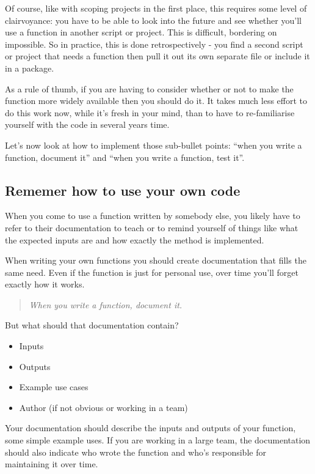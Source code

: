 \documentclass[
  letterpaper,
  DIV=11,
  numbers=noendperiod]{scrreprt}
\providecommand{\tightlist}{%
  \setlength{\itemsep}{0pt}\setlength{\parskip}{0pt}}\usepackage{longtable,booktabs,array}
\begin{document}
Of course, like with scoping projects in the first place, this requires
some level of clairvoyance: you have to be able to look into the future
and see whether you'll use a function in another script or project. This
is difficult, bordering on impossible. So in practice, this is done
retrospectively - you find a second script or project that needs a
function then pull it out its own separate file or include it in a
package.

As a rule of thumb, if you are having to consider whether or not to make
the function more widely available then you should do it. It takes much
less effort to do this work now, while it's fresh in your mind, than to
have to re-familiarise yourself with the code in several years time.

Let's now look at how to implement those sub-bullet points: ``when you
write a function, document it'' and ``when you write a function, test
it''.

\subsection{Rememer how to use your own
code}\label{rememer-how-to-use-your-own-code}

When you come to use a function written by somebody else, you likely
have to refer to their documentation to teach or to remind yourself of
things like what the expected inputs are and how exactly the method is
implemented.

When writing your own functions you should create documentation that
fills the same need. Even if the function is just for personal use, over
time you'll forget exactly how it works.

\begin{quote}
\emph{When you write a function, document it.}
\end{quote}

But what should that documentation contain?

\begin{itemize}
\tightlist
\item
  Inputs
\item
  Outputs
\item
  Example use cases
\item
  Author (if not obvious or working in a team)
\end{itemize}

Your documentation should describe the inputs and outputs of your
function, some simple example uses. If you are working in a large team,
the documentation should also indicate who wrote the function and who's
responsible for maintaining it over time.
\end{document}
